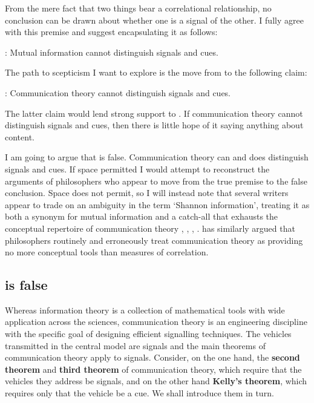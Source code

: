 \documentclass[12pt]{article}
\begin{document}
From the mere fact that two things bear a correlational relationship, no conclusion can be drawn about whether one is a signal of the other.
I fully agree with this premise and suggest encapsulating it as follows:

\begin{myquote}
\ami: Mutual information cannot distinguish signals and cues.
\end{myquote}

\noindent The path to scepticism I want to explore is the move from \ami{} to the following claim:

\begin{myquote}
\act: Communication theory cannot distinguish signals and cues.
\end{myquote}

\noindent The latter claim would lend strong support to \tic{}.
If communication theory cannot distinguish signals and cues, then there is little hope of it saying anything about content.

I am going to argue that \act{} is false.
Communication theory can and does distinguish signals and cues.
If space permitted I would attempt to reconstruct the arguments of philosophers who appear to move from the true premise to the false conclusion.
Space does not permit, so I will instead note that several writers appear to trade on an ambiguity in the term `Shannon information', treating it as both a synonym for mutual information and a catch-all that exhausts the conceptual repertoire of communication theory \citep[p. 1 and $\S$2]{godfrey-smith2016biological}, \citep[759]{owren2010redefining}, \citep[106]{dennett2017bacteria}, \citep[p. 12, n. 11 and p. 78, n. 5]{shea2018representation}.
\citet[1216]{martinez2019representations} has similarly argued that philosophers routinely and erroneously treat communication theory as providing no more conceptual tools than measures of correlation.

\subsection{\act{} is false}\label{subsec:actFalse}

Whereas information theory is a collection of mathematical tools with wide application across the sciences, communication theory is an engineering discipline with the specific goal of designing efficient signalling techniques.
The vehicles transmitted in the central model are signals and the main theorems of communication theory apply to signals.
Consider, on the one hand, the \textbf{second theorem} and \textbf{third theorem} of communication theory, which require that the vehicles they address be signals, and on the other hand \textbf{Kelly's theorem}, which requires only that the vehicle be a cue.
We shall introduce them in turn.
\end{document}
